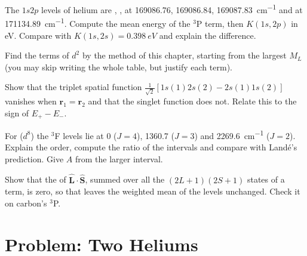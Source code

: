 \begin{exercise}[$\star\star$]\label{exo:b3:many-electron-atoms:8}
The $1s2p$ levels of helium are , ,
 at 169086.76, 169086.84, \qty{169087.83}{cm^{-1}} and
 at \qty{171134.89}{cm^{-1}}. Compute the mean energy of the
${}^3$P term, then $K(1s,2p)$ in eV. Compare with $K(1s,2s) = \qty{0.398}{eV}$
and explain the difference.
\end{exercise}

\begin{exercise}[$\star\star$]\label{exo:b3:many-electron-atoms:9}
Find the terms of $d^2$ by the method of this chapter, starting from the
largest $M_L$ (you may skip writing the whole table, but justify each term).
\end{exercise}

\begin{exercise}[$\star\star\star$]\label{exo:b3:many-electron-atoms:10}
Show that the triplet spatial function $\frac{1}{\sqrt2}[1s(1)2s(2) -
2s(1)1s(2)]$ vanishes when $\mathbf r_1 = \mathbf r_2$ and that the singlet
function does not. Relate this to the sign of $E_+ - E_-$.
\end{exercise}

\begin{exercise}[$\star\star\star$]\label{exo:b3:many-electron-atoms:11}
For  ($d^8$) the ${}^3$F levels lie at 0 ($J = 4$), 1360.7 ($J = 3$)
and \qty{2269.6}{cm^{-1}} ($J = 2$). Explain the order, compute the ratio of
the intervals and compare with Landé's prediction. Give $A$ from the larger
interval.
\end{exercise}

\begin{exercise}[$\star\star\star$]\label{exo:b3:many-electron-atoms:12}
Show that the  of $\hat{\mathbf L}\cdot\hat{\mathbf S}$, summed
over all the $(2L+1)(2S+1)$ states of a term, is zero, so that  leaves the weighted mean of the levels unchanged. Check it on
carbon's ${}^3$P.
\end{exercise}

\section{Problem: Two Heliums}

